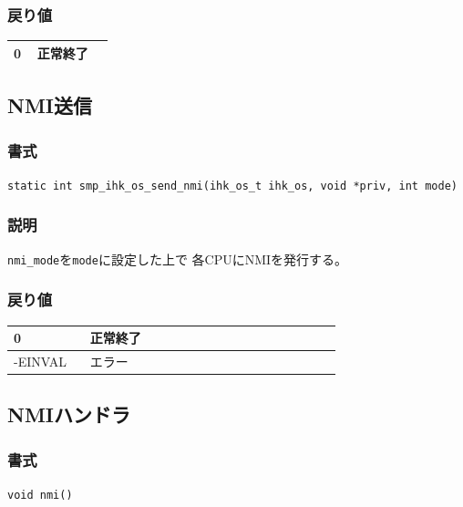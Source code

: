\documentclass[twoside,11pt,fleqn]{book}
\begin{document}
\subsubsection*{戻り値}
\begin{table}[!h]
\footnotesize
\begin{tabular}{|p{0.20\linewidth}|p{0.66\linewidth}|} \hline
0&正常終了\\ \hline
\end{tabular}
\vspace{-0em}
\end{table}
\FloatBarrier

\subsection{NMI送信}
\subsubsection*{書式}{\quad} \texttt{static int smp\_ihk\_os\_send\_nmi(ihk\_os\_t ihk\_os, void *priv, int mode)}
\subsubsection*{説明}{\quad}
\texttt{nmi\_mode}を\texttt{mode}に設定した上で
各CPUにNMIを発行する。

\subsubsection*{戻り値}{\quad}
\begin{table}[!h]
\footnotesize
\begin{tabular}{|p{0.20\linewidth}|p{0.66\linewidth}|} \hline
0&正常終了\\ \hline
-EINVAL&エラー\\ \hline
\end{tabular}
\vspace{-0em}
\end{table}
\FloatBarrier

\subsection{NMIハンドラ}
\subsubsection*{書式}{\quad} \texttt{void nmi()}
\end{document}
